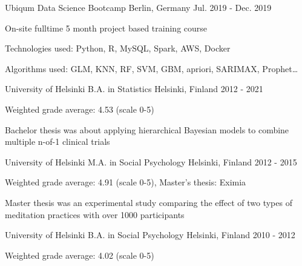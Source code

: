 

\begin{cventries}


  \cventry
    {Ubiqum} %
    {Data Science Bootcamp} %
    {Berlin, Germany} %
    {Jul. 2019 - Dec. 2019} %
    {
      \begin{cvitems} %
        \item {On-site fulltime 5 month project based training course}
        \item {Technologies used: Python, R, MySQL, Spark, AWS, Docker}
        \item {Algorithms used: GLM, KNN, RF, SVM, GBM, apriori, SARIMAX, Prophet\ldots}
      \end{cvitems}
    }

  \cventry
    {University of Helsinki} %
    {B.A. in Statistics} %
    {Helsinki, Finland} %
    {2012 - 2021} %
    {
      \begin{cvitems} %
        \item {Weighted grade average: 4.53 (scale 0-5)}
        \item {Bachelor thesis was about applying hierarchical Bayesian models to
        combine multiple n-of-1 clinical trials}
      \end{cvitems}
    }

  \cventry
    {University of Helsinki} %
    {M.A. in Social Psychology} %
    {Helsinki, Finland} %
    {2012 - 2015} %
    {
      \begin{cvitems} %
        \item {Weighted grade average: 4.91 (scale 0-5), Master's thesis: Eximia}
        \item {Master thesis was an experimental study comparing the effect of two
        types of meditation practices with over 1000 participants}
      \end{cvitems}
    }

  \cventry
    {University of Helsinki} %
    {B.A. in Social Psychology} %
    {Helsinki, Finland} %
    {2010 - 2012} %
    {
      \begin{cvitems} %
        \item {Weighted grade average: 4.02 (scale 0-5)}
      \end{cvitems}
    }


\end{cventries}
